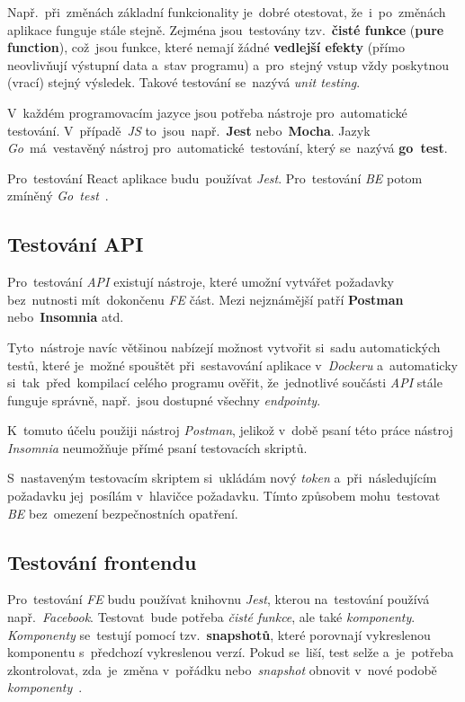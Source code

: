 \documentclass[11pt,a4paper]{report}
\let\oldacrshort\acrshort
\renewcommand{\acrshort}[1]{\emph{\normalsize\color[rgb]{0,0,0}\noindent\oldacrshort{#1}}}
\begin{document}
            Např.~při~změnách základní funkcionality je~dobré otestovat, že~i~po~změnách aplikace funguje stále stejně. Zejména jsou~testovány tzv.~\textbf{čisté funkce} (\textbf{pure function}), což~jsou funkce, které nemají žádné \textbf{vedlejší efekty} (přímo neovlivňují výstupní data a~stav programu) a~pro~stejný vstup vždy poskytnou (vrací) stejný výsledek. Takové testování se~nazývá \emph{unit testing}.
            
            V~každém programovacím jazyce jsou potřeba nástroje pro~automatické testování. V~případě~\acrshort{JS} to~jsou~např.~\textbf{Jest} nebo~\textbf{Mocha}. Jazyk \emph{Go}~má~vestavěný nástroj pro~automatické~testování, který se~nazývá \textbf{go~test}.
            
            Pro~testování React aplikace budu~používat \emph{Jest}. Pro~testování \acrshort{BE} potom zmíněný \emph{Go~test}~\cite{jestjsTestingReact}.
            
            \subsection{Testování API}
                Pro~testování \acrshort{API} existují nástroje, které umožní vytvářet požadavky bez~nutnosti mít~dokončenu \acrshort{FE} část. Mezi nejznámější patří \textbf{Postman} nebo~\textbf{Insomnia} atd.
                
                Tyto~nástroje navíc většinou nabízejí možnost vytvořit si~sadu automatických testů, které je~možné spouštět při~sestavování aplikace v~\emph{Dockeru} a~automaticky si~tak~před~kompilací celého programu ověřit, že~jednotlivé součásti \acrshort{API} stále funguje správně, např.~jsou dostupné všechny \emph{endpointy}.

                K~tomuto účelu použiji nástroj \emph{Postman}, jelikož v~době psaní této práce nástroj \emph{Insomnia} neumožňuje přímé psaní testovacích skriptů. 
                
                S~nastaveným testovacím skriptem si~ukládám nový \emph{token} a~při~následujícím požadavku jej~posílám v~hlavičce požadavku. Tímto způsobem mohu~testovat \acrshort{BE} bez~omezení bezpečnostních opatření.

            \subsection{Testování frontendu}
                Pro~testování \acrshort{FE} budu používat knihovnu \emph{Jest}, kterou na~testování používá např.~\emph{Facebook}. Testovat~bude potřeba \emph{čisté funkce}, ale také \emph{komponenty}. \emph{Komponenty} se~testují pomocí tzv.~\textbf{snapshotů}, které porovnají vykreslenou komponentu s~předchozí vykreslenou verzí. Pokud se~liší, test selže a~je~potřeba zkontrolovat, zda~je~změna v~pořádku nebo~\emph{snapshot} obnovit v~nové podobě \emph{komponenty}~\cite{jestjsTestingReact}.
\end{document}
